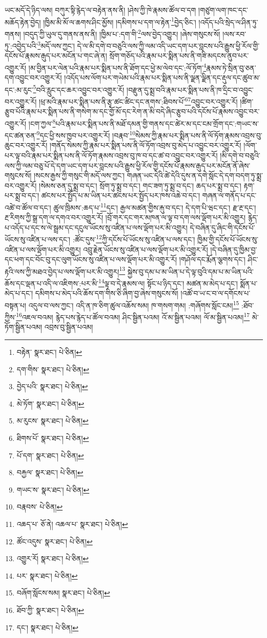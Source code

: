 ཡང་མདོ་དེ་ཉིད་ལས། བཀུར་སྟི་རྙེད་ལ་བརྟེན་ནས་ནི། །ཤེས་ཀྱི་ཁེ་རྣམས་ཚོལ་བ་དག །གཙུག་ལག་ཁང་དང་མཆོད་རྟེན་བྱེད། །ཁྱིམ་མི་མོ་ལ་ཆགས་ཤིང་མྱོས། །དམིགས་པ་དག་ལ་རྟེན་\footnote{བརྟེན་  སྣར་ཐང་།  པེ་ཅིན། }བྱེད་ཅིང་། །འདོད་པའི་སྲེད་ལ་ཤིན་ཏུ་གནས། །བདུད་ཀྱི་ཡུལ་དུ་གནས་ནས་ནི། །ཁྱིམ་པ་:དག་གི་\footnote{དག་གིས་  སྣར་ཐང་།  པེ་ཅིན། }ལས་བྱེད་འགྱུར། །ཞེས་གསུངས་སོ། །ལས་རབ་ཏུ་:འབྱེད་པའི་\footnote{བྱེད་པའི་  སྣར་ཐང་།  པེ་ཅིན། }མདོ་ལས་ཀྱང་། དེ་ལ་མི་དགེ་བ་བཅུའི་ལས་ཀྱི་ལམ་འདི་ཡང་དག་པར་བླངས་པའི་རྒྱུས་ཕྱི་རོལ་གྱི་དངོས་པོ་རྣམས་རྒུད་པར་མངོན་པ་གང་ཞེ་ན། སྲོག་གཅོད་པའི་རྣམ་པར་སྨིན་པས་ནི་གཟི་མདངས་ནུབ་པར་འགྱུར་རོ། །མ་བྱིན་པར་ལེན་པའི་རྣམ་པར་སྨིན་པས་ནི་ཐོག་དང་ཕྱེ་མ་ལེབ་དང་:ལོ་ཏོག་\footnote{མེ་ཏོག་  སྣར་ཐང་།  པེ་ཅིན། }རྣམས་ཏེ་སྲིན་བུ་ཅན་དག་འབྱུང་བར་འགྱུར་རོ། །འདོད་པས་ལོག་པར་གཡེམ་པའི་རྣམ་པར་སྨིན་པས་ནི་ལྗན་ལྗིན་དང་རྡུལ་དང་ཚུབ་མ་དང་:མ་རུང་\footnote{མ་རུངས་  སྣར་ཐང་།  པེ་ཅིན། }བའི་རླུང་དང་ཆར་འབྱུང་བར་འགྱུར་རོ། །བརྫུན་དུ་སྨྲ་བའི་རྣམ་པར་སྨིན་པས་ནི་ཁ་དྲིང་བ་འབྱུང་བར་འགྱུར་རོ། །ཕྲ་མའི་རྣམ་པར་སྨིན་པས་ནི་རྩྭ་ཚང་ཚིང་དང་ནགས་:ཐིབས་པོ་\footnote{ཐིགས་པོ་  སྣར་ཐང་།  པེ་ཅིན། }\footnote{པོ་དག་  སྣར་ཐང་།  པེ་ཅིན། }འབྱུང་བར་འགྱུར་རོ། །ཚིག་རྩུབ་པོའི་རྣམ་པར་སྨིན་པས་ནི་གསེག་མ་དང་གྱོ་མོ་དང་རེག་ན་མི་བདེ་ཞིང་རྩུབ་པའི་དངོས་པོ་རྣམས་འབྱུང་བར་འགྱུར་རོ། །ངག་ཀྱལ་\footnote{བརྐྱལ་  སྣར་ཐང་།  པེ་ཅིན། }པའི་རྣམ་པར་སྨིན་པས་ནི་མཐོ་དམན་གྱི་གནས་དང་ཚེར་མ་དང་ངམ་གྲོག་དང་:གཡང་ས་དང་ཚན་ཅན་\footnote{གཡང་ས་  སྣར་ཐང་།  པེ་ཅིན། }དང་ཕྱི་སས་ཁྱབ་པར་འགྱུར་རོ། །བརྣབ་\footnote{བརྣབས་  པེ་ཅིན། }སེམས་ཀྱི་རྣམ་པར་སྨིན་པས་ནི་ལོ་ཏོག་རྣམས་འབྲས་བུ་ཆུང་བར་འགྱུར་རོ། །གནོད་སེམས་ཀྱི་རྣམ་པར་སྨིན་པས་ནི་ལོ་ཏོག་འབྲས་བུ་མེད་པ་འབྱུང་བར་འགྱུར་རོ། །ལོག་པར་ལྟ་བའི་རྣམ་པར་སྨིན་པས་ནི་ལོ་ཏོག་རྣམས་འབྲས་བུ་ཁ་བ་དང་ཚ་བ་འབྱུང་བར་འགྱུར་རོ། །མི་དགེ་བ་བཅུའི་ལས་ཀྱི་ལམ་བཅུ་པོ་དེ་དག་ཡང་དག་པར་བླངས་པའི་རྒྱུས་ཕྱི་རོལ་གྱི་དངོས་པོ་རྣམས་རྒུད་པར་མངོན་ནོ་ཞེས་གསུངས་སོ། །སངས་རྒྱས་ཀྱི་གསུང་གི་མདོ་ལས་ཀྱང་། གཞན་ཡང་དེའི་ཚེ་དེའི་དུས་ན་དགེ་སློང་དེ་དག་བདག་ཏུ་སྨྲ་བར་འགྱུར་རོ། །སེམས་ཅན་དུ་སྨྲ་བ་དང་། སྲོག་ཏུ་སྨྲ་བ་དང་། གང་ཟག་ཏུ་སྨྲ་བ་དང་། ཆད་པར་སྨྲ་བ་དང་། རྟག་པར་སྨྲ་བ་དང་། ཚངས་པར་སྤྱོད་པ་མ་ཡིན་པར་ཚངས་པར་སྤྱོད་པར་ཁས་འཆེ་བ་དང་། གཞན་ལ་གནོད་པ་དང་འཚེ་བ་ཚོལ་བ་དང་། ཚུལ་ཁྲིམས་:ཆད་པ་\footnote{འཆད་པ་  ཅོ་ནེ། འཆལ་པ་  སྣར་ཐང་།  པེ་ཅིན། }དང་། རྒྱལ་མཚན་གྱིས་རྐུ་བ་དང་། དེ་དག་པི་ཝང་དང་། རྫ་རྔ་དང་། རྔ་རིགས་ཀྱི་སྒྲ་དག་ལ་དགའ་བར་འགྱུར་རོ། །བྲོ་གར་དང་གར་མཁན་ལ་ལྟ་བ་དག་ལས་ལྡོག་པར་མི་འགྱུར། རྙེད་པ་འདོད་པ་དང་ས་ལེ་སྦྲམ་དང་དངུལ་ཡོངས་སུ་འཛིན་པ་ལས་ལྡོག་པར་མི་འགྱུར། དེ་བཞིན་དུ་ཞིང་གི་དངོས་པོ་ཡོངས་སུ་འཛིན་པ་ལས་དང་། :ཚོང་དུས་\footnote{ཚོང་འདུས་  སྣར་ཐང་།  པེ་ཅིན། }ཀྱི་དངོས་པོ་ཡོངས་སུ་འཛིན་པ་ལས་དང་། ཁྱིམ་གྱི་དངོས་པོ་ཡོངས་སུ་འཛིན་པ་ལས་ལྡོག་པར་མི་འགྱུར། འབྲུ་རྗེན་ཡོངས་སུ་འཛིན་པ་ལས་ལྡོག་པར་མི་འགྱུར་རོ། །དེ་བཞིན་དུ་ཁྱིམ་བྱ་དང་ཕག་དང་བོང་བུ་དང་ལུག་ཡོངས་སུ་འཛིན་པ་ལས་ལྡོག་པར་མི་འགྱུར་རོ། །གཤོལ་དང་རྨོན་ལྕགས་དང་། ཤིང་རྟའི་ལས་ཀྱི་མཐའ་བྱེད་པ་ལས་ལྡོག་པར་མི་འགྱུར།\footnote{འགྱུར་རོ།  སྣར་ཐང་།  པེ་ཅིན། } སྐྱེས་བུ་དམ་པ་མ་ཡིན་པ་དེ་ལྟ་བུའི་དམ་པ་མ་ཡིན་པའི་ཆོས་དང་ལྡན་པ་འདི་ལ་འཇིགས་:པར་མི་\footnote{པར་  སྣར་ཐང་།  པེ་ཅིན། }ལྟ་བ་དེ་རྣམས་ལ། སྟོང་པ་ཉིད་དང་། མཚན་མ་མེད་པ་དང་། སྨོན་པ་མེད་པ་དང་། དམིགས་པ་མེད་པའི་ཆོས་དག་གིས་ཅི་ཞིག་བྱ་ཞེས་གསུངས་སོ། །འཚོ་བ་ཡ་ང་བ་ལ་དགོངས་པ་བསྟན་པ། འདུལ་བ་ལས་ཀྱང་། འདི་ན་ཁ་ཅིག་ཚུལ་འཆོས་སམ། ཁ་གསག་གམ། :གཞོགས་སློང་ངམ།\footnote{བཞོག་སློངས་སམ།  སྣར་ཐང་།  པེ་ཅིན། } :ཐོབ་ཀྱིས་\footnote{ཐོབ་ཀྱི་  སྣར་ཐང་།  པེ་ཅིན། }འཇལ་བའམ། རྙེད་པས་རྙེད་པ་ཚོལ་བའམ། ཤིང་སྦྱིན་པའམ། འོ་མ་སྦྱིན་པའམ། ལོ་མ་སྦྱིན་པའམ།\footnote{དང་།  སྣར་ཐང་།  པེ་ཅིན། } མེ་ཏོག་སྦྱིན་པའམ། འབྲས་བུ་སྦྱིན་པའམ། 